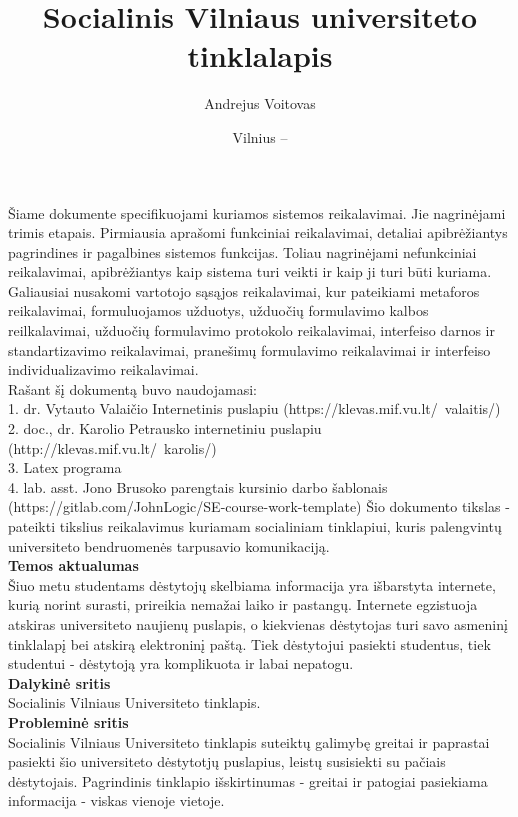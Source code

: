\documentclass{VUMIFPSkursinis}
\title{Socialinis Vilniaus universiteto tinklalapis}
\author{Andrejus Voitovas}
\date{Vilnius – \the\year}
\begin{document}
\maketitle
\cleardoublepage{}
\setcounter{page}{2}
Šiame dokumente specifikuojami kuriamos sistemos reikalavimai. Jie nagrinėjami trimis etapais. Pirmiausia aprašomi funkciniai reikalavimai, detaliai apibrėžiantys pagrindines ir pagalbines sistemos funkcijas. Toliau nagrinėjami nefunkciniai reikalavimai, apibrėžiantys kaip sistema turi veikti ir kaip ji turi būti kuriama. Galiausiai nusakomi vartotojo sąsąjos reikalavimai, kur pateikiami metaforos reikalavimai, formuluojamos užduotys, užduočių formulavimo kalbos reilkalavimai, užduočių formulavimo protokolo reikalavimai, interfeiso darnos ir standartizavimo reikalavimai, pranešimų formulavimo reikalavimai ir interfeiso individualizavimo reikalavimai.
\\Rašant šį dokumentą buvo naudojamasi:
\\1. dr. Vytauto Valaičio Internetinis puslapiu (https://klevas.mif.vu.lt/~valaitis/)
\\2. doc., dr. Karolio Petrausko internetiniu puslapiu (http://klevas.mif.vu.lt/~karolis/)
\\3. Latex programa
\\4. lab. asst. Jono Brusoko parengtais kursinio darbo šablonais (https://gitlab.com/JohnLogic/SE-course-work-template)
\newpage
\tableofcontents
{}
Šio dokumento tikslas - pateikti tikslius reikalavimus kuriamam socialiniam tinklapiui, kuris palengvintų universiteto bendruomenės tarpusavio komunikaciją.
\\\textbf{Temos aktualumas}
\\Šiuo metu studentams dėstytojų skelbiama informacija yra išbarstyta internete, kurią norint surasti, prireikia nemažai laiko ir pastangų. Internete egzistuoja atskiras universiteto naujienų puslapis, o kiekvienas dėstytojas turi savo asmeninį tinklalapį bei atskirą elektroninį paštą. Tiek dėstytojui pasiekti studentus, tiek studentui - dėstytoją yra komplikuota ir labai nepatogu.
\\\textbf{Dalykinė sritis}
\\Socialinis Vilniaus Universiteto tinklapis.
\\\textbf{Probleminė sritis} 
\\Socialinis Vilniaus Universiteto tinklapis suteiktų galimybę greitai ir paprastai pasiekti šio universiteto dėstytotjų puslapius, leistų susisiekti su pačiais dėstytojais. Pagrindinis tinklapio išskirtinumas - greitai ir patogiai pasiekiama informacija - viskas vienoje vietoje.
\end{document}
